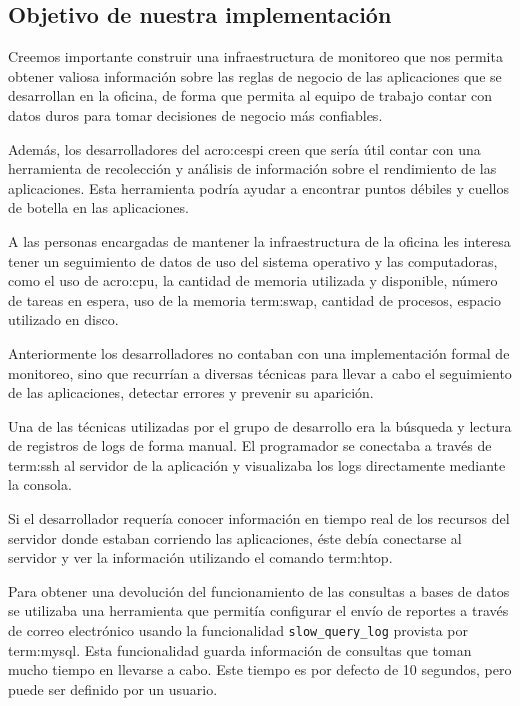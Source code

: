 \subsection{Objetivo de nuestra implementación}
\label{objetivos_de_nuestra_implementacion}

Creemos importante construir una infraestructura de monitoreo que nos permita
obtener valiosa información sobre las reglas de negocio de las aplicaciones que
se desarrollan en la oficina, de forma que permita al equipo de trabajo contar
con datos duros para tomar decisiones de negocio más confiables.

Además, los desarrolladores del \gls{acro:cespi} creen que sería útil contar con una
herramienta de recolección y análisis de información sobre el rendimiento de
las aplicaciones. Esta herramienta podría ayudar a encontrar puntos débiles y
cuellos de botella en las aplicaciones.

A las personas encargadas de mantener la infraestructura de la oficina les
interesa tener un seguimiento de datos de uso del sistema operativo y las
computadoras, como el uso de \gls{acro:cpu}, la cantidad de memoria utilizada y
disponible, número de tareas en espera, uso de la memoria \gls{term:swap},
cantidad de procesos, espacio utilizado en disco.

Anteriormente los desarrolladores no contaban con una implementación formal de
monitoreo, sino que recurrían a diversas técnicas para llevar a cabo el
seguimiento de las aplicaciones, detectar errores y prevenir su aparición.

Una de las técnicas utilizadas por el grupo de desarrollo era la búsqueda y
lectura de registros de logs de forma manual. El programador se conectaba a
través de \gls{term:ssh} al servidor de la aplicación y visualizaba los logs
directamente mediante la consola.

Si el desarrollador requería conocer información en tiempo real de los recursos
del servidor donde estaban corriendo las aplicaciones, éste debía conectarse al
servidor y ver la información utilizando el comando \gls{term:htop}.

Para obtener una devolución del funcionamiento de las consultas a bases de
datos se utilizaba una herramienta que permitía configurar el envío de reportes
a través de correo electrónico usando la funcionalidad
\texttt{slow\_query\_log} provista por \gls{term:mysql}. Esta funcionalidad
guarda información de consultas que toman mucho tiempo en llevarse a cabo. Este
tiempo es por defecto de 10 segundos, pero puede ser definido por un usuario.

